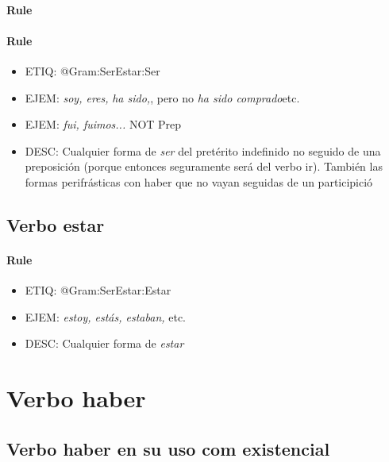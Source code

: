 \documentclass[11pt]{report}
\begin{document}
\paragraph*{Rule}
\paragraph*{Rule}
\begin{itemize}
\item ETIQ: @Gram:SerEstar:Ser
\item EJEM: \emph{soy, eres,} \emph{ha sido,}, pero no \emph{ha sido comprado}etc. 
\item EJEM: \emph{fui, fuimos...} NOT Prep 
\item DESC: Cualquier forma de \emph{ser} del pretérito indefinido no seguido de una preposición (porque entonces seguramente será del verbo ir). También las formas perifrásticas con haber que no vayan seguidas de un participició
\end{itemize}

\subsection{Verbo estar}
\paragraph*{Rule}
\begin{itemize}
\item ETIQ: @Gram:SerEstar:Estar
\item EJEM: \emph{estoy, estás, estaban,} etc. 
\item DESC: Cualquier forma de \emph{estar}
\end{itemize}

\section{Verbo haber}
\subsection{Verbo haber en su uso com existencial}
\end{document}
